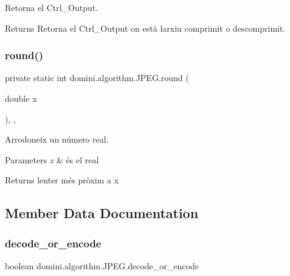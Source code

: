 Retorna el Ctrl\+\_\+\+Output. 

\begin{DoxyReturn}{Returns}
Retorna el Ctrl\+\_\+\+Output on està l\textquotesingle{}arxiu comprimit o descomprimit. 
\end{DoxyReturn}
\mbox{\label{classdomini_1_1algorithm_1_1JPEG_aa9c52789d61d5eebdeb13ee39f8e817d}} 
\subsubsection{\texorpdfstring{round()}{round()}}
{\footnotesize\ttfamily private static int domini.\+algorithm.\+J\+P\+E\+G.\+round (\begin{DoxyParamCaption}\item[{double}]{x }\end{DoxyParamCaption})\hspace{0.3cm}{\ttfamily [inline]}, {\ttfamily [static]}, {\ttfamily [private]}}



Arrodoneix un número real. 


\begin{DoxyParams}{Parameters}
{\em x} & és el real \\
\hline
\end{DoxyParams}
\begin{DoxyReturn}{Returns}
l\textquotesingle{}enter més pròxim a x 
\end{DoxyReturn}


\subsection{Member Data Documentation}
\mbox{\label{classdomini_1_1algorithm_1_1JPEG_a3ff24cf46363c31ffa24e3604bf3ced8}} 
\subsubsection{\texorpdfstring{decode\+\_\+or\+\_\+encode}{decode\_or\_encode}}
{\footnotesize\ttfamily boolean domini.\+algorithm.\+J\+P\+E\+G.\+decode\+\_\+or\+\_\+encode\hspace{0.3cm}{\ttfamily [package]}}


